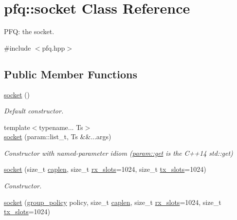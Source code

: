 \hypertarget{classpfq_1_1socket}{\section{pfq\+:\+:socket Class Reference}
\label{classpfq_1_1socket}
}


P\+F\+Q\+: the socket.  




{\ttfamily \#include $<$pfq.\+hpp$>$}

\subsection*{Public Member Functions}
\begin{DoxyCompactItemize}
\item 
\hyperlink{classpfq_1_1socket_a169a46cd01a5fd0a71919ece48f18d9d}{socket} ()
\begin{DoxyCompactList}\small\item\em Default constructor. \end{DoxyCompactList}\item 
{\footnotesize template$<$typename... Ts$>$ }\\\hyperlink{classpfq_1_1socket_aa53695f39b45a0fa9520d52a1a35d2bf}{socket} (param\+::list\+\_\+t, Ts \&\&...args)
\begin{DoxyCompactList}\small\item\em Constructor with named-\/parameter idiom (\hyperlink{namespacepfq_1_1param_a09da2abc1a228d7f77c35bed3bdb157d}{param\+::get} is the C++14 std\+::get) \end{DoxyCompactList}\item 
\hyperlink{classpfq_1_1socket_ad0e09474a9919723dfdf142e2b1e5386}{socket} (size\+\_\+t \hyperlink{classpfq_1_1socket_ab68dbba5ef01041b9c96758c4a9f0a6c}{caplen}, size\+\_\+t \hyperlink{classpfq_1_1socket_a5cf700fc12d67b91df3d669ac4aa737a}{rx\+\_\+slots}=1024, size\+\_\+t \hyperlink{classpfq_1_1socket_a019d15a072c043d6a1333ca0c836da4c}{tx\+\_\+slots}=1024)
\begin{DoxyCompactList}\small\item\em Constructor. \end{DoxyCompactList}\item 
\hyperlink{classpfq_1_1socket_a419985e445525a7dbfae6d9ace452427}{socket} (\hyperlink{namespacepfq_ac41249c8510558905b01fa4d866a38d7}{group\+\_\+policy} policy, size\+\_\+t \hyperlink{classpfq_1_1socket_ab68dbba5ef01041b9c96758c4a9f0a6c}{caplen}, size\+\_\+t \hyperlink{classpfq_1_1socket_a5cf700fc12d67b91df3d669ac4aa737a}{rx\+\_\+slots}=1024, size\+\_\+t \hyperlink{classpfq_1_1socket_a019d15a072c043d6a1333ca0c836da4c}{tx\+\_\+slots}=1024)

\end{DoxyCompactItemize}
